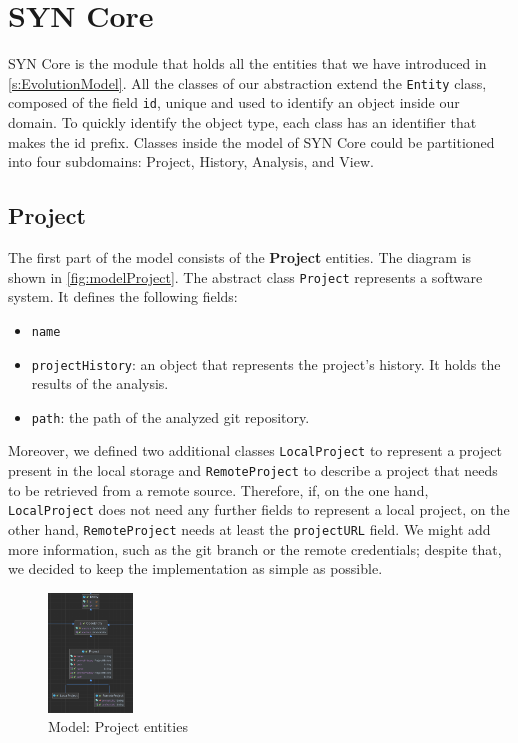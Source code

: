 \section{SYN Core}
SYN Core is the module that holds all the entities that we have introduced in \autoref{s:EvolutionModel}. 
All the classes of our abstraction extend the \texttt{Entity} class, composed of the field \texttt{id}, unique and used to identify an object inside our domain. 
To quickly identify the object type, each class has an identifier that makes the id prefix. 
Classes inside the model of SYN Core could be partitioned into four subdomains: Project, History, Analysis, and View. 

\subsection*{Project}
The first part of the model consists of the \textbf{Project} entities. 
The diagram is shown in \autoref{fig:modelProject}. The abstract class \texttt{Project} represents a software system. It defines the following fields:
\begin{itemize}
    \item \texttt{name}
    \item \texttt{projectHistory}: an object that represents the project's history. It holds the results of the analysis. 
    \item \texttt{path}: the path of the analyzed git repository. 
\end{itemize}

Moreover, we defined two additional classes \texttt{LocalProject} to represent a project present in the local storage and \texttt{RemoteProject} to describe a project that needs to be retrieved from a remote source. 
Therefore, if, on the one hand, \texttt{LocalProject} does not need any further fields to represent a local project, on the other hand, \texttt{RemoteProject} needs at least the \texttt{projectURL} field. We might add more information, such as the git branch or the remote credentials; despite that, we decided to keep the implementation as simple as possible. 


\begin{figure}
    \center
    \includegraphics[width=0.2\textwidth]{UMLProject.png}
    \caption{Model: Project entities}
    \label{fig:modelProject}
\end{figure}

